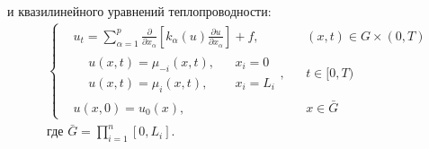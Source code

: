 и квазилинейного уравнений теплопроводности:
\begin{equation*}
    \begin{aligned}
        &\left\{ 
            \begin{aligned}
                & u_t = \sum\limits_{\alpha = 1}^{p} \frac{\partial }{\partial x_{\alpha}} \left[ 
                    k_{\alpha}(u) \frac{\partial u}{\partial x_{\alpha}}
                 \right] + f, && (x, t) \in G \times (0, T)\\
                & \begin{aligned}
                    & u(x, t) = \mu_{-i}(x, t), && x_i = 0\\
                    & u(x, t) = \mu_{i}(x, t), && x_i = L_i
                \end{aligned}, && t \in [0, T)\\
                &u(x, 0) = u_0(x), && x \in \bar{G}
            \end{aligned}
        \right.\\
        &\text{где } \bar{G} = \prod\limits_{i=1}^{n} [0, L_i].
    \end{aligned}
\end{equation*}